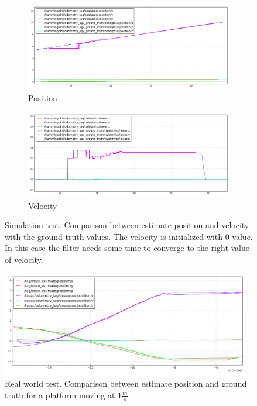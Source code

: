 \begin{figure}[!htbp]
  \centering
   \begin{subfigure}[b]{0.45\textwidth}
        \includegraphics[width=\textwidth]{img/position_simulation.png}
        \caption{Position }
        \label{fig:one}
   \end{subfigure}\hfill
   \begin{subfigure}[b]{0.45\textwidth}
        \includegraphics[width=\textwidth]{img/velocity_simulation.png}
        \caption{Velocity}
        \label{fig:two}
   \end{subfigure}
  \caption{Simulation test. Comparison between estimate position and velocity with the ground truth values. The velocity is initialized with 0 value. In this case the filter needs some time to converge to the right value of velocity.}
  \label{fig:ekf_simulation_hot_init}
\end{figure}

\begin{figure}[!ht]
    \centering
    \includegraphics[width=0.97\textwidth]{img/position_real_world.png}
    \caption{Real world test. Comparison between estimate position and ground truth for a platform moving at $1\frac{m}{s}$}
    \label{fig:ekf_position_real}
\end{figure}

